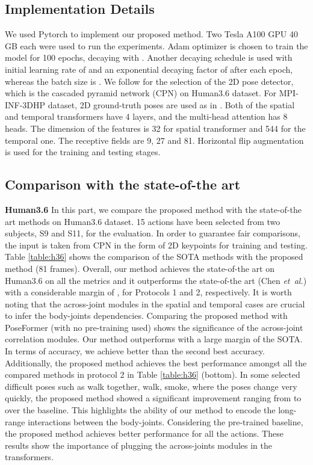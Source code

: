 \documentclass[runningheads]{llncs}
\newcommand{\latinphrase}[1]{\textit{#1}}
\newcommand{\etal}{\latinphrase{et~al.}\xspace}
\begin{document}
\subsection{Implementation Details}
We used Pytorch \cite{pytorch} to implement our proposed method. Two Tesla A100 GPU 40 GB each were used to run the experiments. Adam optimizer \cite{adam} is chosen to train the model for 100 epochs, decaying with . Another decaying schedule is used with initial learning rate of  and an exponential decaying factor of  after each epoch, whereas the batch size is . We follow \cite{pavllo20193d} for the selection of the 2D pose detector, which is the cascaded pyramid network (CPN) \cite{cpn} on Human3.6 dataset. For MPI-INF-3DHP dataset, 2D ground-truth poses are used as in \cite{pavllo20193d}. Both of the spatial and temporal transformers have 4 layers, and the multi-head attention has 8 heads. The dimension of the features is 32 for spatial transformer and 544 for the temporal one. The receptive fields are 9, 27 and 81. Horizontal flip augmentation is used for the training and testing stages.
\subsection{Comparison with the state-of-the art}
\textbf{Human3.6} In this part, we compare the proposed method with the state-of-the art methods on Human3.6 dataset. 15 actions have been selected from two subjects, S9 and S11, for the evaluation.  In order to guarantee fair comparisons, the input is taken from CPN in the form of 2D keypoints for training and testing.  Table \ref{table:h36} shows the comparison of the SOTA methods with the proposed method (81 frames). Overall, our method achieves the state-of-the art on Human3.6 on all the metrics and it outperforms the state-of-the art (Chen \etal \cite{chen2021anatomy}) with a considerable margin of ,  for Protocols 1 and 2, respectively. It is worth noting that the across-joint modules in the spatial and temporal cases are crucial to infer the body-joints dependencies. Comparing the proposed method with PoseFormer (with no pre-training used) shows  the significance of the across-joint correlation modules. Our method outperforms with a large margin of  the SOTA. In terms of accuracy, we achieve  better than the second best accuracy. Additionally, the proposed method achieves the best performance amongst all the compared methods in protocol 2 in Table \ref{table:h36} (bottom). In some selected difficult poses such as walk together, walk, smoke, where the poses change very quickly, the proposed method showed a significant improvement ranging from  to   over the baseline. This highlights the ability of our method to encode the long-range interactions between the body-joints. Considering the pre-trained baseline, the proposed method achieves better performance for all the actions. These results show the importance of plugging the across-joints modules in the transformers.
\end{document}
